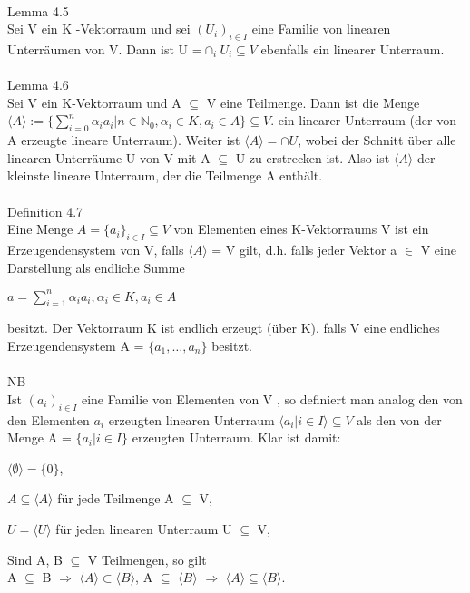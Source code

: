 \documentclass[fontsize=10pt]{scrartcl}
\begin{document}
\\
Lemma 4.5\\
Sei V ein K -Vektorraum und sei $(U_i )_{i \in I}$ eine Familie von linearen Unterräumen von V. Dann ist U =$\cap_i U_i \subseteq V$ ebenfalls ein linearer Unterraum. \\
\\
Lemma 4.6\\
Sei V ein K-Vektorraum und A $\subseteq$ V eine Teilmenge. Dann ist die Menge $\langle A \rangle := \big\{ \sum\nolimits_{i=0}^{n} \alpha_i a_i | n \in \mathbb{N}_0, \alpha_i \in K, a_i \in A \big\} \subseteq V$.
ein linearer Unterraum (der von A erzeugte lineare Unterraum). Weiter ist $\langle A \rangle = \cap U$, wobei der Schnitt über alle linearen Unterräume U von V mit A $\subseteq$ U zu erstrecken ist. Also ist $\langle A \rangle$ der kleinste lineare Unterraum, der die Teilmenge A enthält.\\
\\
Definition 4.7\\
Eine Menge $A = \{a_i\}_{i \in I} \subseteq V$ von Elementen eines K-Vektorraums V ist ein Erzeugendensystem von V, falls $\langle A \rangle$ = V gilt, d.h. falls jeder Vektor a $\in$ V eine Darstellung als endliche Summe
\begin{center}
$a = \sum\nolimits_{i=1}^{n}\alpha_i a_i, \alpha_i \in K, a_i \in A$
\end{center}
besitzt. Der Vektorraum K ist endlich erzeugt (über K), falls V eine endliches Erzeugendensystem A = $\{a_1, …, a_n\}$ besitzt.\\
\\
NB\\
Ist $(a_i)_{i \in I}$ eine Familie von Elementen von V , so definiert man analog den von den Elementen $a_i$ erzeugten linearen Unterraum $\langle a_i | i \in I \rangle \subseteq V$ als den von der Menge A = $\{a_i | i \in I\}$ erzeugten Unterraum. Klar ist 
damit:
\begin{compactitem}
\item $\langle \emptyset \rangle = \{0\}$,
\item $A \subseteq \langle A \rangle$ für jede Teilmenge A $\subseteq$ V, 
\item $U = \langle U \rangle$ für jeden linearen Unterraum U $\subseteq$ V, 
\item Sind A, B $\subseteq$ V Teilmengen, so gilt\\ 
A $\subseteq$ B $\Rightarrow$ $\langle A \rangle \subset \langle B \rangle$, \hspace*{3mm}
A $\subseteq$ $\langle B \rangle$ $\Rightarrow$ $\langle A \rangle \subseteq \langle B \rangle$.\\
\end{compactitem} 
\end{document}
